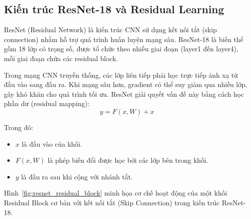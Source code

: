\subsection{Kiến trúc ResNet-18 và Residual Learning}

ResNet (Residual Network) là kiến trúc CNN sử dụng kết nối tắt (skip connection) nhằm hỗ trợ quá trình huấn luyện mạng sâu. ResNet-18 là biến thể gồm 18 lớp có trọng số, được tổ chức theo nhiều giai đoạn (layer1 đến layer4), mỗi giai đoạn chứa các residual block.

Trong mạng CNN truyền thống, các lớp liên tiếp phải học trực tiếp ánh xạ từ đầu vào sang đầu ra. Khi mạng sâu hơn, gradient có thể suy giảm qua nhiều lớp, gây khó khăn cho quá trình tối ưu. ResNet giải quyết vấn đề này bằng cách học phần dư (residual mapping):
\begin{equation}
  y=F(x,W)+x
\end{equation}

Trong đó:
\begin{itemize}
  \item $x$ là đầu vào của khối.
  \item $F(x,W)$ là phép biến đổi được học bởi các lớp bên trong khối.
  \item $y$ là đầu ra sau khi cộng với nhánh tắt.
\end{itemize}

Hình~\ref{fig:resnet_residual_block} minh họa cơ chế hoạt động của một khối Residual Block cơ bản với kết nối tắt (Skip Connection) trong kiến trúc ResNet-18.

